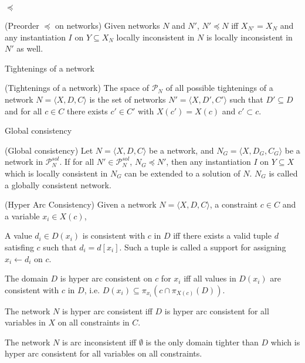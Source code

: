 \documentclass[10pt,aspectratio=43,mathserif]{beamer}
\begin{document}
\begin{frame}{$\preceq$}
            \begin{definition}
                (Preorder $\preceq$ on networks\cite{rossi2006handbook}) Given networks $N$ and $N'$, $N'\preceq N$ iff $X_{N'}=X_N$ and any instantiation $I$ on $Y\subseteq X_N$ locally inconsistent in $N$ is locally inconsistent in $N'$ as well.
            \end{definition}
\end{frame}

\begin{frame}{Tightenings of a network}
            \begin{definition}
                (Tightenings of a network\cite{rossi2006handbook}) The space of $\mathcal P_N$ of all possible tightenings of a network $N=\langle X,D,C\rangle$ is the set of networks $N'=\langle X,D',C'\rangle$ such that $D'\subseteq D$ and for all $c\in C$ there exists $c'\in C'$ with $X(c')=X(c)$ and $c'\subset c$.
            \end{definition}
\end{frame}

\begin{frame}{Global consistency}
            \begin{definition}
                (Global consistency\cite{rossi2006handbook}) Let $N=\langle X,D,C\rangle$ be a network, and $N_G=\langle X,D_G,C_G\rangle$ be a network in $\mathcal P^{sol}_N$. If for all $N'\in \mathcal P^{sol}_N$, $N_G\preceq N'$, then any instantiation $I$ on $Y\subseteq X$ which is locally consistent in $N_G$ can be extended to a solution of $N$. $N_G$ is called a globally consistent network.
            \end{definition}
\end{frame}

\begin{frame}
            \begin{definition}
                (Hyper Arc Consistency) Given a network $N=\langle X,D,C\rangle$, a constraint $c\in C$ and a variable $x_i\in X(c)$,

                A value $d_i\in D(x_i)$ is consistent with $c$ in $D$ iff there exists a valid tuple $d$ satisfing $c$ such that $d_i=d[x_i]$. Such a tuple is called a support for assigning $x_i\gets d_i$ on $c$.

                The domain $D$ is hyper arc consistent on $c$ for $x_i$ iff all values in $D(x_i)$ are consistent with $c$ in $D$, i.e. $D(x_i)\subseteq \pi_{x_i} (c\cap \pi_{X(c)} (D))$.

                The network $N$ is hyper arc consistent iff $D$ is hyper arc consistent for all variables in $X$ on all constraints in $C$.

                The network $N$ is arc inconsistent iff $\emptyset$ is the only domain tighter than $D$ which is hyper arc consistent for all variables on all constraints.
            \end{definition}
\end{frame}
\end{document}

